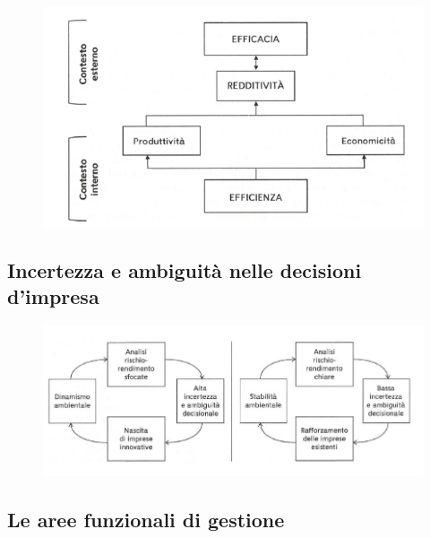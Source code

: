 \begin{figure}[H]
    \centering
    \includegraphics[width=0.5\linewidth]{1/img/Screenshot from 2022-07-03 11-35-16.png}
\end{figure}

\subsection{Incertezza e ambiguità nelle decisioni d'impresa}

\begin{figure}[H]
    \centering
    \includegraphics[width=0.7\linewidth]{1/img/Screenshot from 2022-07-03 11-36-56.png}
\end{figure}

\subsection{Le aree funzionali di gestione}

